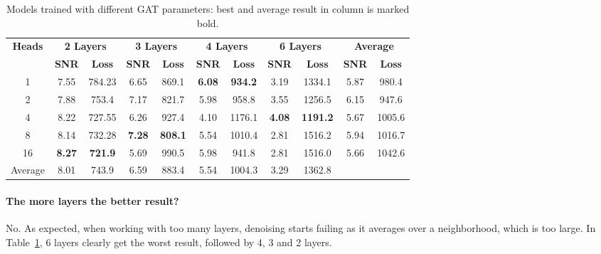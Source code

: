 \begin{table}[H]
  \centering
  \begin{tabular}{c|cc|cc|cc|cc|cc}
    \toprule
    \textbf{Heads} & \multicolumn{2}{c|}{\footnotesize \textbf{2 Layers}} & \multicolumn{2}{c|}{\footnotesize \textbf{3 Layers}} & \multicolumn{2}{c|}{\footnotesize \textbf{4 Layers}} & \multicolumn{2}{c|}{\footnotesize \textbf{6 Layers}} & \multicolumn{2}{c}{\footnotesize \textbf{Average}} \\
                   & \textbf{SNR} & \textbf{Loss} & \textbf{SNR} & \textbf{Loss} & \textbf{SNR} & \textbf{Loss} & \textbf{SNR} & \textbf{Loss} & \textbf{SNR} & \textbf{Loss} \\ 
    \midrule
    1    &  7.55	         & 784.23          & 6.65	          & 869.1          & \textbf{6.08}	& \textbf{934.2}  & 3.19	        & 1334.1          & 5.87 & 980.4 \\ \hline
    2    &  7.88	         & 753.4           & 7.17	          & 821.7          & 5.98	          & 958.8           & 3.55	        & 1256.5          & 6.15 & 947.6 \\ \hline
    4    &  8.22	         & 727.55          & 6.26	          & 927.4          & 4.10	          & 1176.1          & \textbf{4.08}	& \textbf{1191.2} & 5.67 & 1005.6 \\ \hline
    8    &  8.14 	         & 732.28          & \textbf{7.28}	& \textbf{808.1} & 5.54	          & 1010.4          & 2.81	        & 1516.2          & 5.94 & 1016.7 \\ \hline
    16   &  \textbf{8.27}  & \textbf{721.9}  & 5.69	          & 990.5          & 5.98	          & 941.8           & 2.81	        & 1516.0          & 5.66 & 1042.6 \\ \hline
    
    Average  &  8.01 & 743.9 & 6.59 & 883.4 & 5.54 & 1004.3 & 3.29 & 1362.8   \\ 
    \midrule
  \end{tabular}
  \caption{Models trained with different GAT parameters: best and average result in column is marked bold. }
  \label{tab:small_gat_results}
\end{table}


\paragraph{The more layers the better result?}
No. As expected, when working with too many layers, denoising starts failing as it averages over a
neighborhood, which is too large. In Table~\ref{tab:small_gat_results}, 6 layers clearly get the worst result,
followed by 4, 3 and 2 layers.

